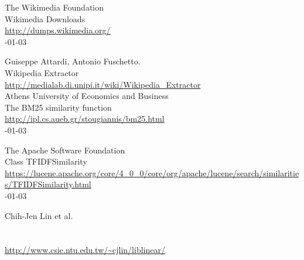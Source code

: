 \documentclass[11pt,letterpaper]{article}
\begin{document}
\begin{thebibliography}{}
The Wikimedia Foundation \\
\newblock Wikimedia Downloads \\
\newblock \url{http://dumps.wikimedia.org/} \\
-01-03

Guiseppe Attardi, Antonio Fuschetto. \\
\newblock Wikipedia Extractor \\
\newblock \url{http://medialab.di.unipi.it/wiki/Wikipedia_Extractor} \\

Athens University of Economics and Business \\
\newblock The BM25 similarity function \\
\newblock \url{http://ipl.cs.aueb.gr/stougiannis/bm25.html} \\
-01-03

The Apache Software Foundation \\
\newblock Class TFIDFSimilarity \\
\newblock \url{https://lucene.apache.org/core/4_0_0/core/org/apache/lucene/search/similarities/TFIDFSimilarity.html} \\
-01-03

Chih-Jen Lin et al. \\
 \\
 \\
\newblock \url{http://www.csie.ntu.edu.tw/~cjlin/liblinear/}

\end{thebibliography}
\end{document}
